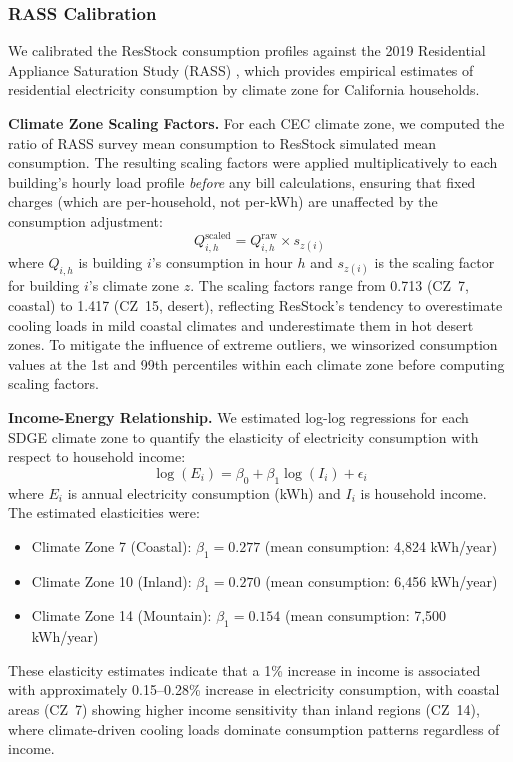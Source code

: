 \documentclass[12pt]{article}
\begin{document}


\subsubsection{RASS Calibration}
\label{sec:rass}

We calibrated the ResStock consumption profiles against the 2019 Residential Appliance Saturation Study (RASS) \citep{[RASS citation]}, which provides empirical estimates of residential electricity consumption by climate zone for California households.

\textbf{Climate Zone Scaling Factors.} For each CEC climate zone, we computed the ratio of RASS survey mean consumption to ResStock simulated mean consumption. The resulting scaling factors were applied multiplicatively to each building's hourly load profile \textit{before} any bill calculations, ensuring that fixed charges (which are per-household, not per-kWh) are unaffected by the consumption adjustment:
\begin{equation}
Q_{i,h}^{\text{scaled}} = Q_{i,h}^{\text{raw}} \times s_{z(i)}
\end{equation}
where $Q_{i,h}$ is building $i$'s consumption in hour $h$ and $s_{z(i)}$ is the scaling factor for building $i$'s climate zone $z$. The scaling factors range from 0.713 (CZ~7, coastal) to 1.417 (CZ~15, desert), reflecting ResStock's tendency to overestimate cooling loads in mild coastal climates and underestimate them in hot desert zones. To mitigate the influence of extreme outliers, we winsorized consumption values at the 1st and 99th percentiles within each climate zone before computing scaling factors.

\textbf{Income-Energy Relationship.} We estimated log-log regressions for each SDGE climate zone to quantify the elasticity of electricity consumption with respect to household income:
\begin{equation}
\log(E_{i}) = \beta_0 + \beta_1 \log(I_{i}) + \epsilon_i
\end{equation}
where $E_i$ is annual electricity consumption (kWh) and $I_i$ is household income. The estimated elasticities were:
\begin{itemize}
    \item Climate Zone 7 (Coastal): $\beta_1 = 0.277$ (mean consumption: 4,824 kWh/year)
    \item Climate Zone 10 (Inland): $\beta_1 = 0.270$ (mean consumption: 6,456 kWh/year)
    \item Climate Zone 14 (Mountain): $\beta_1 = 0.154$ (mean consumption: 7,500 kWh/year)
\end{itemize}
These elasticity estimates indicate that a 1\% increase in income is associated with approximately 0.15--0.28\% increase in electricity consumption, with coastal areas (CZ~7) showing higher income sensitivity than inland regions (CZ~14), where climate-driven cooling loads dominate consumption patterns regardless of income.
\end{document}
